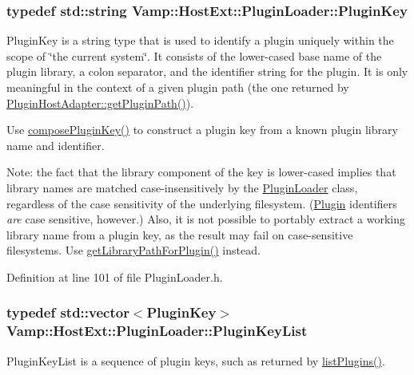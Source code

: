 \subsubsection[{\texorpdfstring{Plugin\+Key}{PluginKey}}]{\setlength{\rightskip}{0pt plus 5cm}typedef {\bf std\+::string} {\bf Vamp\+::\+Host\+Ext\+::\+Plugin\+Loader\+::\+Plugin\+Key}}\hypertarget{class_vamp_1_1_host_ext_1_1_plugin_loader_a473645bbb3ac5c1a0da2f0f482947c4d}{}\label{class_vamp_1_1_host_ext_1_1_plugin_loader_a473645bbb3ac5c1a0da2f0f482947c4d}
Plugin\+Key is a string type that is used to identify a plugin uniquely within the scope of \char`\"{}the current system\char`\"{}. It consists of the lower-\/cased base name of the plugin library, a colon separator, and the identifier string for the plugin. It is only meaningful in the context of a given plugin path (the one returned by \hyperlink{class_vamp_1_1_plugin_host_adapter_a08d7ed3a11bf4a3c30fa0f9b41a0fed6}{Plugin\+Host\+Adapter\+::get\+Plugin\+Path()}).

Use \hyperlink{class_vamp_1_1_host_ext_1_1_plugin_loader_abe147b1da483df1afef5c0655aaf3f8d}{compose\+Plugin\+Key()} to construct a plugin key from a known plugin library name and identifier.

Note\+: the fact that the library component of the key is lower-\/cased implies that library names are matched case-\/insensitively by the \hyperlink{class_vamp_1_1_host_ext_1_1_plugin_loader}{Plugin\+Loader} class, regardless of the case sensitivity of the underlying filesystem. (\hyperlink{class_vamp_1_1_plugin}{Plugin} identifiers {\itshape are} case sensitive, however.) Also, it is not possible to portably extract a working library name from a plugin key, as the result may fail on case-\/sensitive filesystems. Use \hyperlink{class_vamp_1_1_host_ext_1_1_plugin_loader_a592d6b4c6edaa369407e833f56e4a4de}{get\+Library\+Path\+For\+Plugin()} instead. 

Definition at line 101 of file Plugin\+Loader.\+h.

\subsubsection[{\texorpdfstring{Plugin\+Key\+List}{PluginKeyList}}]{\setlength{\rightskip}{0pt plus 5cm}typedef std\+::vector$<${\bf Plugin\+Key}$>$ {\bf Vamp\+::\+Host\+Ext\+::\+Plugin\+Loader\+::\+Plugin\+Key\+List}}\hypertarget{class_vamp_1_1_host_ext_1_1_plugin_loader_a0d48b76e4f995110f53e0feeb23f733a}{}\label{class_vamp_1_1_host_ext_1_1_plugin_loader_a0d48b76e4f995110f53e0feeb23f733a}
Plugin\+Key\+List is a sequence of plugin keys, such as returned by \hyperlink{class_vamp_1_1_host_ext_1_1_plugin_loader_aec450c2928b1ae5318d45972722dd16b}{list\+Plugins()}. 

